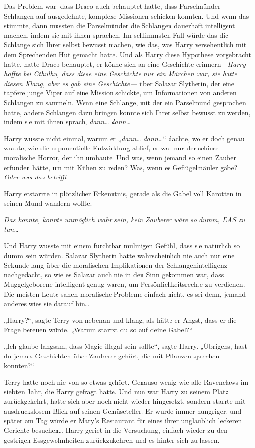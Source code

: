 {Das Problem war, dass Draco auch behauptet hatte, dass Parselmünder Schlangen auf ausgedehnte, komplexe Missionen schicken konnten. Und wenn das stimmte, dann mussten die Parselmünder die Schlangen dauerhaft intelligent machen, indem sie mit ihnen sprachen. Im schlimmsten Fall würde das die Schlange sich Ihrer selbst bewusst machen, wie das, was Harry versehentlich mit dem Sprechenden Hut gemacht hatte. Und als Harry diese Hypothese vorgebracht hatte, hatte Draco behauptet, er könne sich an eine Geschichte erinnern - \emph{Harry hoffte bei Cthulhu, dass diese eine Geschichte nur ein Märchen war, sie hatte diesen Klang, aber es gab eine Geschichte—} über Salazar Slytherin, der eine tapfere junge Viper auf eine Mission schickte, um Informationen von anderen Schlangen zu sammeln. Wenn eine Schlange, mit der ein Parselmund gesprochen hatte, andere Schlangen dazu bringen konnte sich Ihrer selbst bewusst zu werden, indem sie mit ihnen sprach, \emph{dann…} \emph{dann…}

Harry wusste nicht einmal, warum er „\emph{dann… dann…}“ dachte, wo er doch genau wusste, wie die exponentielle Entwicklung ablief, es war nur der schiere moralische Horror, der ihn umhaute. Und was, wenn jemand so einen Zauber erfunden hätte, um mit Kühen zu reden? Was, wenn es Geflügelmäuler gäbe? \emph{Oder was das betrifft…}

Harry erstarrte in plötzlicher Erkenntnis, gerade als die Gabel voll Karotten in seinen Mund wandern wollte.

\emph{Das konnte, konnte unmöglich wahr sein, kein Zauberer wäre so dumm, DAS zu tun…}

Und Harry wusste mit einem furchtbar mulmigen Gefühl, dass sie natürlich so dumm sein würden. Salazar Slytherin hatte wahrscheinlich nie auch nur eine Sekunde lang über die moralischen Implikationen der Schlangenintelligenz nachgedacht, so wie es Salazar auch nie in den Sinn gekommen war, dass Muggelgeborene intelligent genug waren, um Persönlichkeitsrechte zu verdienen. Die meisten Leute sahen moralische Probleme einfach nicht, es sei denn, jemand anderes wies sie darauf hin…

„Harry?“, sagte Terry von nebenan und klang, als hätte er Angst, dass er die Frage bereuen würde. „Warum starrst du so auf deine Gabel?“

„Ich glaube langsam, dass Magie illegal sein sollte“, sagte Harry. „Übrigens, hast du jemals Geschichten über Zauberer gehört, die mit Pflanzen sprechen konnten?“

Terry hatte noch nie von so etwas gehört. Genauso wenig wie alle Ravenclaws im siebten Jahr, die Harry gefragt hatte. Und nun war Harry zu seinem Platz zurückgekehrt, hatte sich aber noch nicht wieder hingesetzt, sondern starrte mit ausdruckslosem Blick auf seinen Gemüseteller. Er wurde immer hungriger, und später am Tag würde er Mary's Restaurant für eines ihrer unglaublich leckeren Gerichte besuchen… Harry geriet in die Versuchung, einfach wieder zu den gestrigen Essgewohnheiten zurückzukehren und es hinter sich zu lassen.

}
